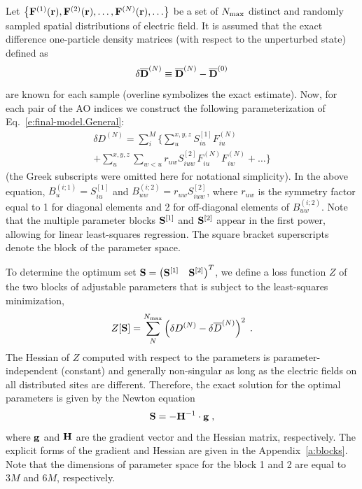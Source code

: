 \documentclass[aip,amsmath,amssymb,reprint,floatfix]{revtex4-1}
\begin{document}
Let  
$\left\{ {\bf F}^{(1)}({\bf r}), {\bf F}^{(2)}({\bf r}), \ldots, {\bf F}^{(N)}({\bf r}), \ldots \right\}$ 
be a set of $N_{\rm max}$ distinct and randomly sampled 
spatial distributions of electric field. It is assumed that
the exact difference one\hyp{}particle density matrices (with respect to the unperturbed state)
defined as
%
\begin{equation}
 \delta \overline{\bf D}^{(N)} \equiv \overline{\bf D}^{(N)} - \overline{\bf D}^{(0)}
\end{equation}
%
are known for each sample (overline symbolizes the exact estimate).
Now, for each pair of the AO indices we construct the following 
parameterization of Eq.~\eqref{e:final-model.General}:
%
\begin{multline}\label{e:final-model.General.Parameters}
 \delta D^{(N)} = \sum_{i }^M \Big\{ 
                              \sum_u^{x,y,z} S^{[1]}_{iu} F_{iu}^{(N)} \\
                +             \sum_{u}^{x,y,z} \sum_{w<u} r_{uw} S^{[2]}_{iuw} F_{iu}^{(N)} F_{iw}^{(N)} 
                        + \ldots \Big\}
\end{multline}
%
(the Greek subscripts were omitted here for notational simplicity).
In the above equation, $B_u^{(i;1)} = S^{[1]}_{iu}$ and $B_{uw}^{(i;2)} = r_{uw} S^{[2]}_{iuw}$,
where $r_{uw}$ is the symmetry factor equal to 1 for diagonal elements and 2 for off\hyp{}diagonal
elements of $B_{uw}^{(i;2)}$.
Note that the multiple parameter blocks 
${\bf S}^{[1]}$ and ${\bf S}^{[2]}$
appear in the first power, allowing for linear least\hyp{}squares regression.
The square bracket superscripts denote the block of the parameter space. 

To determine the optimum set 
$
 {\bf S} = 
\begin{pmatrix}
{\bf S}^{[1]} &
{\bf S}^{[2]} 
\end{pmatrix}^T
$, we define a loss function $Z$ 
of the two blocks of adjustable parameters
that is subject to the least\hyp{}squares minimization,
%
\begin{equation}\label{e:Z}
 Z[{\bf S}] = \sum_N^{N_{\rm max}} \left( \delta D^{(N)} - \delta \overline{D}^{(N)} \right)^2 \;.
\end{equation}
%
The Hessian of $Z$ computed with respect to the parameters 
is parameter\hyp{}independent (constant) and generally non\hyp{}singular
as long as the electric fields on all distributed sites are different.
Therefore, the exact solution for the optimal parameters is given by the Newton equation
%
\begin{equation}\label{e:Newton}
 {\bf S} = -{\bf H}^{-1} \cdot {\bf g} \;,
\end{equation}
%
where ${\bf g}$ and ${\bf H}$ are the gradient vector and the Hessian matrix, respectively.
The explicit forms of the gradient and Hessian are given in the Appendix~\ref{a:blocks}.
Note that the dimensions of parameter space for the block 1 and 2 are
equal to $3M$ and $6M$, respectively.
\end{document}
